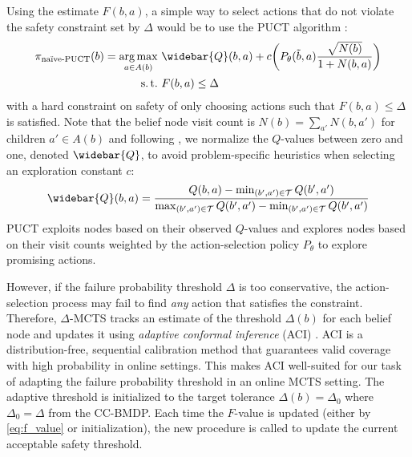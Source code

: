 Using the estimate $F(b,a)$, a simple way to select actions that do not violate the safety constraint set by $\Delta$ would be to use the PUCT algorithm \cite{silver2018general}:
\begin{align}
    \pi_\text{na\"ive-PUCT}(b) = \argmax_{a \in A(b)}& \ \widebar{Q}(b, a) + c \bigg(P_\theta(\tilde{b},a) \frac{\sqrt{N(b)}}{1 + N(b,a)} \bigg) \\
    \operatorname{s.t.}& \ F(b,a) \le \Delta
\end{align}
with a hard constraint on safety of only choosing actions such that $F(b,a) \le \Delta$ is satisfied.
Note that the belief node visit count is $N(b) = \sum_{a'} N(b,a')$ for children ${a' \in A(b)}$ and following \textcite{schrittwieser2020mastering}, we normalize the $Q$-values between zero and one, denoted $\widebar{Q}$, to avoid problem-specific heuristics when selecting an exploration constant $c$:
\begin{gather}
    \widebar{Q}(b,a) = \frac{Q(b, a) - \min_{(b',a') \in \mathcal{T}} Q(b', a')}{\max_{(b',a') \in \mathcal{T}} Q(b', a') - \min_{(b',a') \in \mathcal{T}} Q(b', a')}
\end{gather}
PUCT exploits nodes based on their observed $Q$-values and explores nodes based on their visit counts weighted by the action-selection policy $P_\theta$ to explore promising actions.

However, if the failure probability threshold $\Delta$ is too conservative, the action-selection process may fail to find \textit{any} action that satisfies the constraint.
Therefore, $\Delta$-MCTS tracks an estimate of the threshold $\Delta(b)$ for each belief node and updates it using \textit{adaptive conformal inference} (ACI) \cite{gibbs2021adaptive}.
ACI is a distribution-free, sequential calibration method that guarantees valid coverage with high probability in online settings.
This makes ACI well-suited for our task of adapting the failure probability threshold in an online MCTS setting.
The adaptive threshold is initialized to the target tolerance $\Delta(b) = \Delta_0$ where $\Delta_0 = \Delta$ from the CC-BMDP.
Each time the $F$-value is updated (either by \cref{eq:f_value} or initialization), the new  procedure is called to update the current acceptable safety threshold.

